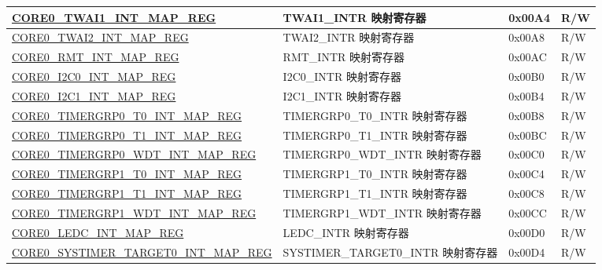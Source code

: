 \begin{longtable}{ | p{8.7cm} | p{6.2cm} | p{1.3cm} | p{1cm} | }
\hyperref[regdesc:CORE0TWAI1INTMAPREG]{CORE0\_TWAI1\_INT\_MAP\_REG} & TWAI1\_INTR 映射寄存器 & 0x00A4 & R/W \\ \hline

\hyperref[regdesc:CORE0TWAI2INTMAPREG]{CORE0\_TWAI2\_INT\_MAP\_REG} & TWAI2\_INTR 映射寄存器 & 0x00A8 & R/W \\ \hline

\hyperref[regdesc:CORE0RMTINTMAPREG]{CORE0\_RMT\_INT\_MAP\_REG} & RMT\_INTR 映射寄存器 & 0x00AC & R/W \\ \hline

\hyperref[regdesc:CORE0I2C0INTMAPREG]{CORE0\_I2C0\_INT\_MAP\_REG} & I2C0\_INTR 映射寄存器 & 0x00B0 & R/W \\ \hline

\hyperref[regdesc:CORE0I2C1INTMAPREG]{CORE0\_I2C1\_INT\_MAP\_REG} & I2C1\_INTR 映射寄存器 & 0x00B4 & R/W \\ \hline

\hyperref[regdesc:CORE0TIMERGRP0T0INTMAPREG]{CORE0\_TIMERGRP0\_T0\_INT\_MAP\_REG} & TIMERGRP0\_T0\_INTR 映射寄存器 & 0x00B8 & R/W \\ \hline

\hyperref[regdesc:CORE0TIMERGRP0T1INTMAPREG]{CORE0\_TIMERGRP0\_T1\_INT\_MAP\_REG} & TIMERGRP0\_T1\_INTR 映射寄存器 & 0x00BC & R/W \\ \hline

\hyperref[regdesc:CORE0TIMERGRP0WDTINTMAPREG]{CORE0\_TIMERGRP0\_WDT\_INT\_MAP\_REG} & TIMERGRP0\_WDT\_INTR 映射寄存器 & 0x00C0 & R/W \\ \hline

\hyperref[regdesc:CORE0TIMERGRP1T0INTMAPREG]{CORE0\_TIMERGRP1\_T0\_INT\_MAP\_REG} & TIMERGRP1\_T0\_INTR 映射寄存器 & 0x00C4 & R/W \\ \hline

\hyperref[regdesc:CORE0TIMERGRP1T1INTMAPREG]{CORE0\_TIMERGRP1\_T1\_INT\_MAP\_REG} & TIMERGRP1\_T1\_INTR 映射寄存器 & 0x00C8 & R/W \\ \hline

\hyperref[regdesc:CORE0TIMERGRP1WDTINTMAPREG]{CORE0\_TIMERGRP1\_WDT\_INT\_MAP\_REG} & TIMERGRP1\_WDT\_INTR 映射寄存器 & 0x00CC & R/W \\ \hline

\hyperref[regdesc:CORE0LEDCINTMAPREG]{CORE0\_LEDC\_INT\_MAP\_REG} & LEDC\_INTR 映射寄存器 & 0x00D0 & R/W \\ \hline

\hyperref[regdesc:CORE0SYSTIMERTARGET0INTMAPREG]{CORE0\_SYSTIMER\_TARGET0\_INT\_MAP\_REG} & SYSTIMER\_TARGET0\_INTR 映射寄存器 & 0x00D4 & R/W \\ \hline


\end{longtable}

